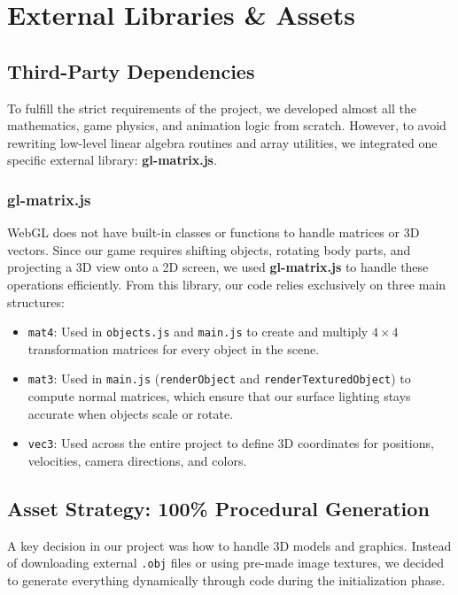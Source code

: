 \chapter{External Libraries \& Assets}

\section{Third-Party Dependencies}
To fulfill the strict requirements of the project, we developed almost all the mathematics, game physics, and animation logic from scratch. However, to avoid rewriting low-level linear algebra routines and array utilities, we integrated one specific external library: \textbf{gl-matrix.js}.

\subsection{gl-matrix.js}
WebGL does not have built-in classes or functions to handle matrices or 3D vectors. Since our game requires shifting objects, rotating body parts, and projecting a 3D view onto a 2D screen, we used \textbf{gl-matrix.js} to handle these operations efficiently. 
From this library, our code relies exclusively on three main structures:
\begin{itemize}
    \item \texttt{mat4}: Used in \texttt{objects.js} and \texttt{main.js} to create and multiply $4\times4$ transformation matrices for every object in the scene.
    \item \texttt{mat3}: Used in \texttt{main.js} (\texttt{renderObject} and \texttt{renderTexturedObject}) to compute normal matrices, which ensure that our surface lighting stays accurate when objects scale or rotate.
    \item \texttt{vec3}: Used across the entire project to define 3D coordinates for positions, velocities, camera directions, and colors.
\end{itemize}

\section{Asset Strategy: 100\% Procedural Generation}
A key decision in our project was how to handle 3D models and graphics. Instead of downloading external \texttt{.obj} files or using pre-made image textures, we decided to generate everything dynamically through code during the initialization phase.

